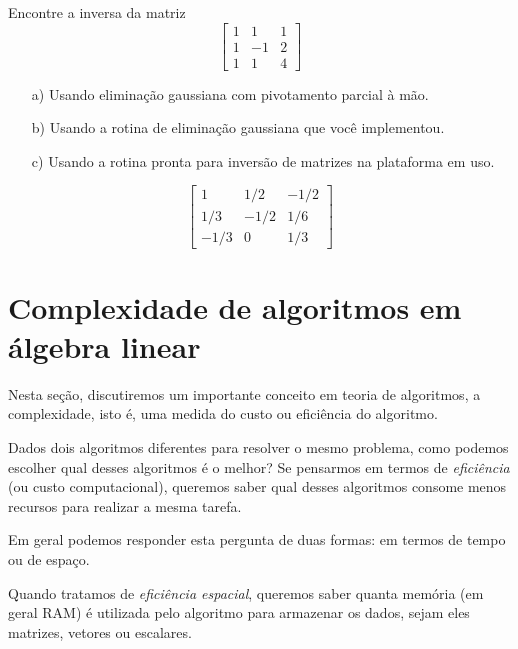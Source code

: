
\begin{exer} Encontre a inversa da matriz
\begin{equation}\left[
\begin{array}{ccc}
1&1&1\\
1&-1&2\\
1&1&4
\end{array}\right]\end{equation}
\begin{itemize}
\item[a)] Usando eliminação gaussiana com pivotamento parcial à mão.
\item[b)] Usando a rotina de eliminação gaussiana que você implementou.
\item[c)] Usando a rotina pronta para inversão de matrizes na plataforma
em uso.
\end{itemize}
\end{exer}
\begin{resp}

 \begin{equation} \left[ \begin {array}{ccc} 1&1/2&-1/2\\1/3&-1/2&1/6
\\-1/3&0&1/3\end {array} \right] \end{equation}

\end{resp}



\section{Complexidade de algoritmos em álgebra linear}
Nesta seção, discutiremos um importante conceito em teoria de algoritmos, a complexidade, isto é, uma medida do custo ou eficiência do algoritmo.

Dados dois algoritmos diferentes para resolver o mesmo problema, como podemos escolher qual desses algoritmos é o melhor? Se pensarmos em termos de \emph{eficiência} (ou custo computacional), queremos saber qual desses algoritmos consome menos recursos para realizar a mesma tarefa.

Em geral podemos responder esta pergunta de duas formas: em termos de tempo ou de espaço.

Quando tratamos de \emph{eficiência espacial}, queremos saber quanta memória (em geral RAM) é utilizada pelo algoritmo para armazenar os dados, sejam eles matrizes, vetores ou escalares.

